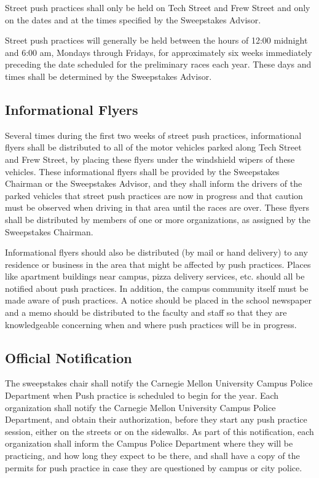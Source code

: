 	Street push practices shall only be held on Tech Street and Frew Street and
	only on the dates and at the times specified by the Sweepstakes Advisor.

	Street push practices will generally be held between the hours of 12:00
	midnight and 6:00 am, Mondays through Fridays, for approximately six weeks
	immediately preceding the date scheduled for the preliminary races each year.
	These days and times shall be determined by the Sweepstakes Advisor.

\subsection{Informational Flyers}

	Several times during the first two weeks of street push practices,
	informational flyers shall be distributed to all of the motor vehicles parked
	along Tech Street and Frew Street, by placing these flyers under the windshield
	wipers of these vehicles. These informational flyers shall be provided by the
	Sweepstakes Chairman or the Sweepstakes Advisor, and they shall inform the
	drivers of the parked vehicles that street push practices are now in progress
	and that caution must be observed when driving in that area until the races are
	over. These flyers shall be distributed by members of one or more
	organizations, as assigned by the Sweepstakes Chairman.

	Informational flyers should also be distributed (by mail or hand delivery) to
	any residence or business in the area that might be affected by push practices.
	Places like apartment buildings near campus, pizza delivery services, etc.
	should all be notified about push practices. In addition, the campus community
	itself must be made aware of push practices. A notice should be placed in the
	school newspaper and a memo should be distributed to the faculty and staff so
	that they are knowledgeable concerning when and where push practices will be in
	progress.

\subsection{Official Notification}

	The sweepstakes chair shall notify the Carnegie Mellon University Campus Police
	Department when Push practice is scheduled to begin for the year. Each
	organization shall notify the Carnegie Mellon University Campus Police
	Department, and obtain their authorization, before they start any push practice
	session, either on the streets or on the sidewalks. As part of this
	notification, each organization shall inform the Campus Police Department where
	they will be practicing, and how long they expect to be there, and shall have a
	copy of the permits for push practice in case they are questioned by campus or
	city police.

